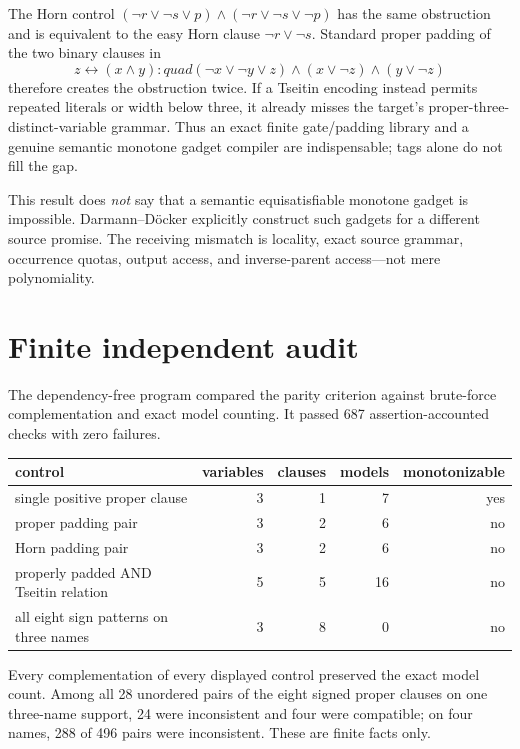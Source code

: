 \documentclass[11pt]{article}
\begin{document}
The Horn control $(\neg r\vee\neg s\vee p)\wedge(\neg r\vee\neg s\vee\neg p)$ has the same obstruction and is equivalent to the easy Horn clause $\neg r\vee\neg s$.  Standard proper padding of the two binary clauses in
\[
 z\leftrightarrow(x\wedge y):quad
 (\neg x\vee\neg y\vee z)\wedge(x\vee\neg z)\wedge(y\vee\neg z)
\]
therefore creates the obstruction twice.  If a Tseitin encoding instead permits repeated literals or width below three, it already misses the target's proper-three-distinct-variable grammar.  Thus an exact finite gate/padding library and a genuine semantic monotone gadget compiler are indispensable; tags alone do not fill the gap.

This result does \emph{not} say that a semantic equisatisfiable monotone gadget is impossible.  Darmann--D\"ocker explicitly construct such gadgets for a different source promise.  The receiving mismatch is locality, exact source grammar, occurrence quotas, output access, and inverse-parent access---not mere polynomiality.

\section{Finite independent audit}
The dependency-free program
compared the parity criterion against brute-force complementation and exact model counting.  It passed 687 assertion-accounted checks with zero failures.
\begin{center}
\begin{tabular}{lrrrr}
\toprule
control & variables & clauses & models & monotonizable\\
\midrule
single positive proper clause &3&1&7&yes\\
proper padding pair &3&2&6&no\\
Horn padding pair &3&2&6&no\\
properly padded AND Tseitin relation &5&5&16&no\\
all eight sign patterns on three names &3&8&0&no\\
\bottomrule
\end{tabular}
\end{center}
Every complementation of every displayed control preserved the exact model count.  Among all 28 unordered pairs of the eight signed proper clauses on one three-name support, 24 were inconsistent and four were compatible; on four names, 288 of 496 pairs were inconsistent.  These are finite facts only.
\end{document}
